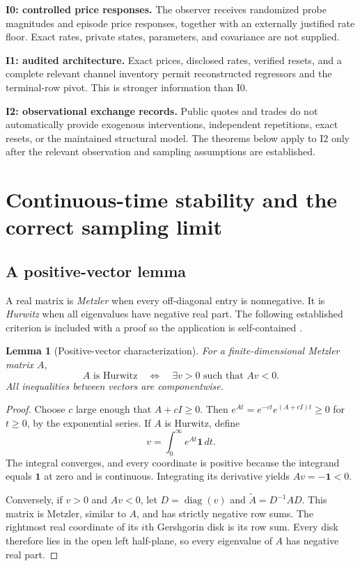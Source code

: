 \documentclass[11pt,a4paper]{article}
\newtheorem{lemma}[theorem]{Lemma}
\theoremstyle{definition}\newtheorem{definition}[theorem]{Definition}
\theoremstyle{remark}\newtheorem{remark}[theorem]{Remark}
\newcommand{\one}{\mathbf 1}\newcommand{\diag}{\operatorname{diag}}
\begin{document}
\textbf{I0: controlled price responses.} The observer receives randomized probe magnitudes and episode price responses, together with an externally justified rate floor. Exact rates, private states, parameters, and covariance are not supplied.

\textbf{I1: audited architecture.} Exact prices, disclosed rates, verified resets, and a complete relevant channel inventory permit reconstructed regressors and the terminal-row pivot. This is stronger information than I0.

\textbf{I2: observational exchange records.} Public quotes and trades do not automatically provide exogenous interventions, independent repetitions, exact resets, or the maintained structural model. The theorems below apply to I2 only after the relevant observation and sampling assumptions are established.

\section{Continuous-time stability and the correct sampling limit}
\subsection{A positive-vector lemma}
A real matrix is \emph{Metzler} when every off-diagonal entry is nonnegative. It is \emph{Hurwitz} when all eigenvalues have negative real part. The following established criterion is included with a proof so the application is self-contained \cite{rantzer}.

\begin{lemma}[Positive-vector characterization]\label{lem:metzler}
For a finite-dimensional Metzler matrix $A$,
\[
 A\text{ is Hurwitz}\quad\Longleftrightarrow\quad
 \exists v>0\text{ such that }Av<0.
\]
All inequalities between vectors are componentwise.
\end{lemma}
\begin{proof}
Choose $c$ large enough that $A+cI\ge0$. Then
$e^{At}=e^{-ct}e^{(A+cI)t}\ge0$ for $t\ge0$, by the exponential series.
If $A$ is Hurwitz, define
\[
 v=\int_0^\infty e^{At}\one\,dt.
\]
The integral converges, and every coordinate is positive because the integrand equals $\one$ at zero and is continuous. Integrating its derivative yields $Av=-\one<0$.

Conversely, if $v>0$ and $Av<0$, let $D=\diag(v)$ and $\widetilde A=D^{-1}AD$. This matrix is Metzler, similar to $A$, and has strictly negative row sums. The rightmost real coordinate of its $i$th Gershgorin disk is its row sum. Every disk therefore lies in the open left half-plane, so every eigenvalue of $A$ has negative real part.
\end{proof}
\end{document}
